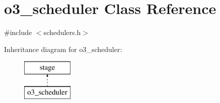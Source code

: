 \hypertarget{classo3__scheduler}{
\section{o3\_\-scheduler Class Reference}
\label{classo3__scheduler}
}


{\ttfamily \#include $<$schedulers.h$>$}

Inheritance diagram for o3\_\-scheduler:\begin{figure}[H]
\begin{center}
\leavevmode
\includegraphics[height=2.000000cm]{classo3__scheduler}
\end{center}
\end{figure}
